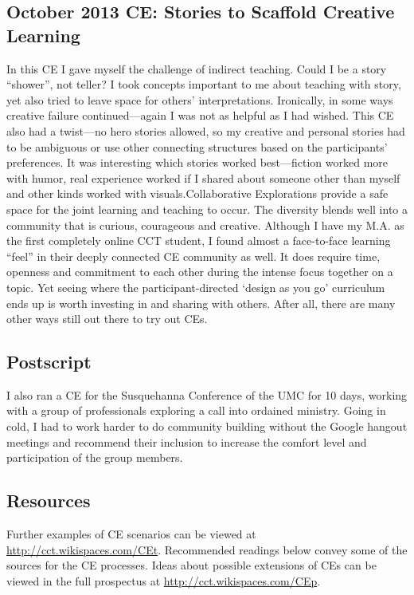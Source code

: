 \subsection{October 2013 CE: Stories to Scaffold Creative Learning}

In this CE I gave myself the challenge of indirect teaching. Could I be
a story ``shower'', not teller? I took concepts important to me about
teaching with story, yet also tried to leave space for others'
interpretations. Ironically, in some ways creative failure
continued---again I was not as helpful as I had wished. This CE also had
a twist---no hero stories allowed, so my creative and personal stories
had to be ambiguous or use other connecting structures based on the
participants' preferences. It was interesting which stories worked
best---fiction worked more with humor, real experience worked if I
shared about someone other than myself and other kinds worked with
visuals.Collaborative Explorations provide a safe space for the joint
learning and teaching to occur. The diversity blends well into a
community that is curious, courageous and creative. Although I have my
M.A. as the first completely online CCT student, I found almost a
face-to-face learning ``feel'' in their deeply connected CE community as
well. It does require time, openness and commitment to each other during
the intense focus together on a topic. Yet seeing where the
participant-directed `design as you go' curriculum ends up is worth
investing in and sharing with others. After all, there are many other
ways still out there to try out CEs.

\subsection{Postscript}

I also ran a CE for the Susquehanna Conference of the UMC for 10 days,
working with a group of professionals exploring a call into ordained
ministry. Going in cold, I had to work harder to do community building
without the Google hangout meetings and recommend their inclusion to
increase the comfort level and participation of the group members.

\subsection{Resources}

Further examples of CE scenarios can be viewed at
\href{http://cct.wikispaces.com/CEt}{http://cct.wikispaces.com/CEt}.
Recommended readings below convey some of the sources for the CE
processes. Ideas about possible extensions of CEs can be viewed in the
full prospectus at
\href{http://cct.wikispaces.com/CEp}{http://cct.wikispaces.com/CEp}.

